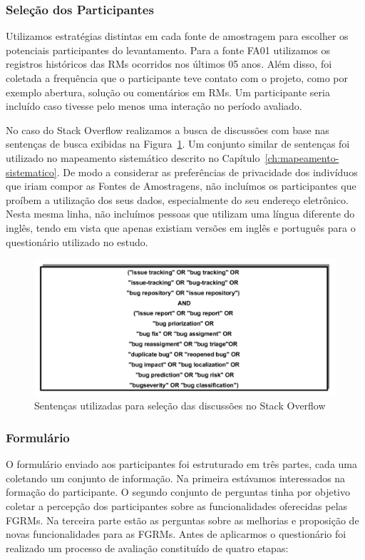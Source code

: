 \subsubsection{Seleção dos Participantes}\label{subsubsec:pesquisa_profissionais_plano_pesquisa}

Utilizamos estratégias distintas em cada fonte de amostragem para escolher os
potenciais participantes do levantamento. Para a fonte FA01 utilizamos os
registros históricos das RMs ocorridos nos últimos 05 anos. Além disso, foi
coletada a frequência que o participante teve contato com o projeto, como por
exemplo abertura, solução ou comentários em RMs. Um participante seria incluído
caso tivesse pelo menos uma interação no período avaliado.

No caso do Stack Overflow realizamos a busca de discussões com base nas
sentenças de busca exibidas na Figura~\ref{fig:setencas-grupos}. Um conjunto
similar de sentenças foi utilizado no mapeamento sistemático descrito no
Capítulo~\ref{ch:mapeamento-sistematico}. De modo a considerar as preferências
de privacidade dos indivíduos que iriam compor as Fontes de Amostragens, não
incluímos os participantes que proíbem a utilização dos seus dados,
especialmente do seu endereço eletrônico. Nesta mesma linha, não incluímos
pessoas que utilizam uma língua diferente do inglês, tendo em vista que apenas
existiam versões em inglês e português para o questionário utilizado no estudo.

\begin{figure}[htpb]
	\centering
	\includegraphics[width=0.7\linewidth]{./chapter-pesquisa-com-profissionais/img/setencas-grupos.pdf}
	\caption{Sentenças utilizadas para seleção das discussões no Stack Overflow}\label{fig:setencas-grupos}
\end{figure}

\subsubsection{Formulário}\label{subsubsec:questionario}

O formulário enviado aos participantes foi estruturado em três partes, cada uma
coletando um conjunto de informação. Na primeira estávamos interessados na
formação do participante. O segundo conjunto de perguntas tinha por objetivo
coletar a percepção dos participantes sobre as funcionalidades oferecidas pelas
FGRMs\@. Na terceira parte estão as perguntas sobre as melhorias e proposição de
novas funcionalidades para as FGRMs. Antes de aplicarmos o questionário foi
realizado um processo de avaliação constituído de quatro etapas:

